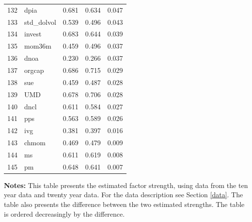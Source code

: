 \begin{footnotesize}
\begin{longtable}{rl|c|c|c}
		132 & dpia & 0.681 & 0.634 & 0.047 \\ 
		133 & std\_dolvol & 0.539 & 0.496 & 0.043 \\ 
		134 & invest & 0.683 & 0.644 & 0.039 \\ 
		135 & mom36m & 0.459 & 0.496 & 0.037 \\ 
		136 & dnoa & 0.230 & 0.266 & 0.037 \\ 
		137 & orgcap & 0.686 & 0.715 & 0.029 \\ 
		138 & sue & 0.459 & 0.487 & 0.028 \\ 
		139 & UMD & 0.678 & 0.706 & 0.028 \\ 
		140 & dncl & 0.611 & 0.584 & 0.027 \\ 
		141 & pps & 0.563 & 0.589 & 0.026 \\ 
		142 & ivg & 0.381 & 0.397 & 0.016 \\ 
		143 & chmom & 0.469 & 0.479 & 0.009 \\ 
		144 & ms & 0.611 & 0.619 & 0.008 \\ 
		145 & pm & 0.648 & 0.641 & 0.007 \\ 
		\hline
	\end{longtable}

			\begin{minipage}{0.7\textwidth}
				
					{\footnotesize {\bf Notes:} This table presents the estimated factor strength, using data from the ten year data and twenty year data. For the data description see Section \ref{data}. 
					The table also presents the difference between the two estimated strengths. 
					The table is ordered decreasingly by the difference. }
\end{minipage}

\end{footnotesize}

\newpage

